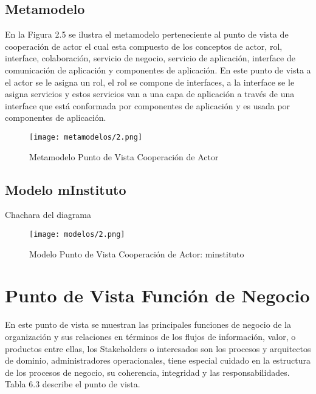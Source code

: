   \subsection{Metamodelo}
  En la Figura 2.5 se ilustra el metamodelo perteneciente al punto de vista de cooperación de actor el cual esta compuesto de los conceptos de actor, rol, interface, colaboración, servicio de negocio, servicio de aplicación, interface de comunicación de aplicación y componentes de aplicación. En este punto de vista a el actor se le asigna un rol, el rol se compone de interfaces, a la interface se le asigna servicios y estos servicios van a una capa de aplicación a través de una interface que está conformada por componentes de aplicación y es usada por componentes de aplicación.
  
  \begin{figure}[!h]
  	\centering
  	\texttt{[image: metamodelos/2.png]}
  	\captionsetup{width=.95\textwidth}
  	\caption{Metamodelo Punto de Vista Cooperación de Actor}
  	\label{metamodelo2}
  \end{figure}
  
  \subsection{Modelo mInstituto}Chachara del diagrama
  \begin{figure}[!h]
  	\centering
  	\texttt{[image: modelos/2.png]}
  	\captionsetup{width=.95\textwidth}
  	\caption{Modelo Punto de Vista Cooperación de Actor: minstituto}
  	\label{modelo2}
  \end{figure}
 
  \section{Punto de Vista Función de Negocio}
  En este punto de vista se muestran las principales funciones de negocio de la organización y sus relaciones en términos de los flujos de información, valor, o productos entre ellas, los Stakeholders o interesados son los procesos y arquitectos de dominio, administradores operacionales, tiene especial cuidado en la estructura de los procesos de negocio, su coherencia, integridad y las responsabilidades. Tabla 6.3 describe el punto de vista.

